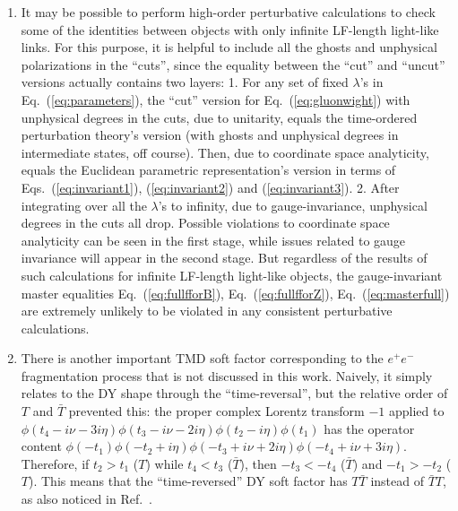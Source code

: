 \documentclass[a4paper,11pt]{article}
\begin{document}
\begin{enumerate}
    \item It may be possible to perform high-order perturbative calculations to check some of the identities between objects with only infinite LF-length light-like links. For this purpose, it is helpful to include all the ghosts and unphysical polarizations in the ``cuts'', since the equality between the ``cut'' and ``uncut'' versions actually contains two layers: 1.  For any set of fixed $\lambda$'s in Eq.~(\ref{eq:parameters}), the ``cut'' version for Eq.~(\ref{eq:gluonwight}) with unphysical degrees in the cuts, due to unitarity, equals the time-ordered perturbation theory's version (with ghosts and unphysical degrees in intermediate states, off course). Then, due to coordinate space analyticity, equals the Euclidean parametric representation's version in terms of Eqs.~(\ref{eq:invariant1}), (\ref{eq:invariant2}) and (\ref{eq:invariant3}).  2.  After integrating over all the $\lambda$'s to infinity, due to gauge-invariance, unphysical degrees in the cuts all drop.  Possible violations to coordinate space analyticity can be seen in the first stage, while issues related to gauge invariance will appear in the second stage. But regardless of the results of such calculations for infinite LF-length light-like objects, the gauge-invariant master equalities Eq.~(\ref{eq:fullfforB}), Eq.~(\ref{eq:fullfforZ}), Eq.~(\ref{eq:masterfull}) are extremely unlikely to be violated in any consistent perturbative calculations. 
   \item There is another important TMD soft factor corresponding to the $e^+e^-$ fragmentation process that is not discussed in this work.  Naively, it simply relates to the DY shape through the ``time-reversal'', but the relative order of $T$ and $\bar T$ prevented this: the proper complex Lorentz transform $-1$ applied to $\phi(t_4-i\nu-3i \eta)\phi(t_3-i\nu-2i \eta)\phi(t_2-i\eta)\phi(t_1)$ has the operator content $\phi(-t_1)\phi(-t_2+i\eta)\phi(-t_3+i\nu+2i \eta)\phi(-t_4+i\nu+3i \eta)$. Therefore, if $t_2>t_1$ ($T$) while $t_4<t_3$ ($\bar T$), then $-t_3<-t_4$ ($\bar T$) and $-t_1>-t_2$ ($T$). This means that the ``time-reversed'' DY soft factor has $T\bar T$ instead of $\bar TT$, as also noticed in Ref.~\cite{Stewart:2009yx}. 
   

\end{enumerate}
\end{document}
